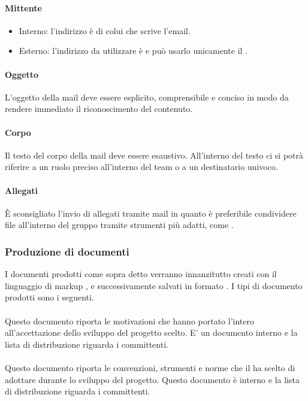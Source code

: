\paragraph{Mittente}
\begin{itemize}
  \item Interno: l'indirizzo è di colui che scrive l'email.
  \item Esterno: l'indirizzo da utilizzare è \email e può usarlo unicamente il \Pm.
\end{itemize}

\paragraph{Oggetto}
L'oggetto della mail deve essere esplicito, comprensibile e conciso in modo da rendere
immediato il riconoscimento del contenuto.

\paragraph{Corpo}
Il testo del corpo della mail deve essere esaustivo. All'interno del
testo ci si potrà riferire a un ruolo preciso all'interno del team o a un destinatario univoco.

\paragraph{Allegati}
È sconsigliato l'invio di allegati tramite mail in quanto è preferibile condividere file all'interno del gruppo tramite strumenti più adatti, come .

\subsubsection{Produzione di documenti}
I documenti prodotti come sopra detto verranno innanzitutto creati con il linguaggio di markup , e successivamente salvati in formato . I tipi di documento prodotti sono i seguenti.

\paragraph{\SdF}
Questo documento riporta le motivazioni che hanno portato l'intero
 all'accettazione dello sviluppo del progetto scelto. E' un documento interno e la lista di distribuzione riguarda i committenti.

\paragraph{\NdP}
Questo documento riporta le convenzioni, strumenti e
norme che il  ha scelto di adottare durante  lo sviluppo del progetto. Questo
documento è interno e la lista di distribuzione riguarda i committenti.

